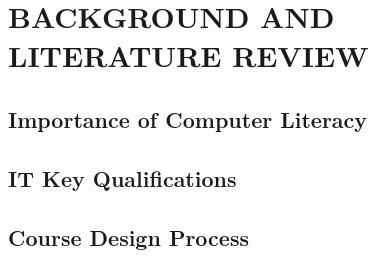 \section{BACKGROUND AND LITERATURE REVIEW}

\subsection{Importance of Computer Literacy}

\subsection{IT Key Qualifications}

\subsection{Course Design Process}